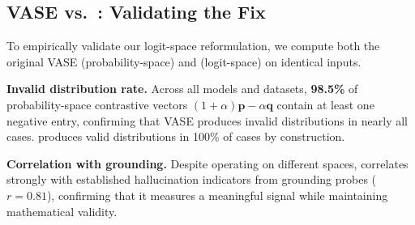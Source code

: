 \subsection{VASE vs.\ \lvase{}: Validating the Fix}

To empirically validate our logit-space reformulation, we compute both the original VASE (probability-space) and \lvase{} (logit-space) on identical inputs.

\noindent\textbf{Invalid distribution rate.}
Across all models and datasets, \textbf{98.5\%} of probability-space contrastive vectors $(1{+}\alpha)\mathbf{p} - \alpha\mathbf{q}$ contain at least one negative entry, confirming that VASE produces invalid distributions in nearly all cases. \lvase{} produces valid distributions in 100\% of cases by construction.

\noindent\textbf{Correlation with grounding.}
Despite operating on different spaces, \lvase{} correlates strongly with established hallucination indicators from grounding probes ($r = 0.81$), confirming that it measures a meaningful signal while maintaining mathematical validity.

